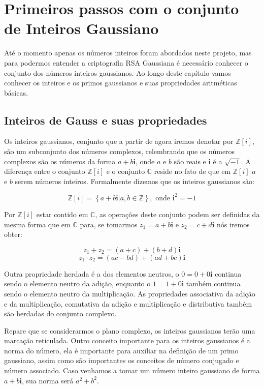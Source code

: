 \pagestyle{fancy}
\fancyhead[R]{\thepage}
\fancyfoot[C]{}



\chapter {Primeiros passos com o conjunto de Inteiros Gaussiano}
\label{IG}
At\'e o momento apenas os n\'umeros inteiros foram abordados neste projeto, mas para podermos entender a criptografia RSA Gaussiana \'e necess\'ario conhecer o conjunto dos n\'umeros inteiros gaussianos. Ao longo deste cap\'itulo vamos conhecer os inteiros e os primos gaussianos e suas propriedades aritm\'eticas b\'asicas. 

\section{Inteiros de Gauss e suas propriedades}

Os inteiros gaussianos, conjunto que a partir de agora iremos denotar por $\mathbb{Z}[i]$, s\~ao um subconjunto dos n\'umeros complexos, relembrando que os n\'umeros complexos s\~ao os n\'umeros da forma $a+b\textbf{i}$, onde $a$ e $b$ s\~ao reais e $\textbf{i}$ \'e a $\sqrt{-1}$. A diferen\c{c}a entre o conjunto $\mathbb{Z}[i]$ e o conjunto $\mathbb{C}$ reside no fato de que em $\mathbb{Z}[i]$ $a$ e $b$ serem n\'umeros inteiros. Formalmente dizemos que os inteiros gaussianos s\~ao:

$$\mathbb{Z}[i]= \left\{a+b\textbf{i} | a,b \in \mathbb{Z}  \right\}, \textrm{ onde } \textbf{i}^2 = -1$$

Por $\mathbb{Z}[i]$ estar contido em $\mathbb{C}$, as opera\c{c}\~oes deste conjunto podem ser definidas da mesma forma que em $\mathbb{C}$ para, se tomarmos $z_1= a + b\textbf{i}$ e $z_2= c + d\textbf{i}$ n\'os iremos obter:

$$z_1   +   z_2 = (a + c) + (b + d)\textbf{i}$$
$$z_1 \cdot z_2 = (ac - bd) + (ad + bc)\textbf{i}$$

Outra propriedade herdada \'e a dos elementos neutros, o $0 = 0 + 0\textbf{i}$ continua sendo o elemento neutro da adi\c{c}\~ao, enquanto o $1 = 1 + 0\textbf{i}$ tamb\'em continua sendo o elemento neutro da multiplica\c{c}\~ao. As propriedades associativa da adi\c{c}\~ao e da multiplica\c{c}\~ao, comutativa da adi\c{c}\~ao e multiplica\c{c}\~ao e distributiva tamb\'em s\~ao herdadas do conjunto complexo.

Repare que se considerarmos o plano complexo, os inteiros gaussianos ter\~ao uma marca\c{c}\~ao reticulada. Outro conceito importante para os inteiros gaussianos \'e a norma do n\'umero, ela \'e importante para auxiliar na defini\c{c}\~ao de um primo gaussiano, assim como s\~ao importantes os conceitos de n\'umero conjugado e n\'umero associado. Caso venhamos a tomar um n\'umero inteiro gaussiano de forma $a+b\textbf{i}$, sua norma ser\'a $a^2 +b^2$.

